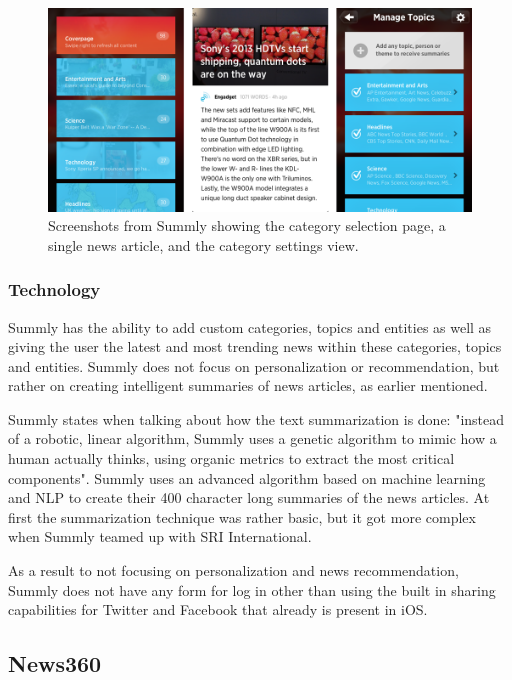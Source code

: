 \begin{figure}[!htbp]
\centering
\includegraphics[width=130mm]{GFX/screenshots/summly.png}
\caption{Screenshots from Summly showing the category selection page, a single news article, and the category settings view.}
\label{screenshots_summly}
\end{figure}

\subsubsection{Technology}

Summly has the ability to add custom categories, topics and entities as well as giving the user the latest and most trending news within these categories, topics and entities. Summly does not focus on personalization or recommendation, but rather on creating intelligent summaries of news articles, as earlier mentioned. 

Summly states when talking about how the text summarization is done: "instead of a robotic, linear algorithm, Summly uses a genetic algorithm to mimic how a human actually thinks, using organic metrics to extract the most critical components"\cite{summly_launch_video}. Summly uses an advanced algorithm based on machine learning and NLP to create their 400 character long summaries of the news articles. At first the summarization technique was rather basic, but it got more complex when Summly teamed up with SRI International\cite{summly_technology}.

As a result to not focusing on personalization and news recommendation, Summly does not have any form for log in other than using the built in sharing capabilities for Twitter and Facebook that already is present in iOS.

\subsection{News360}


